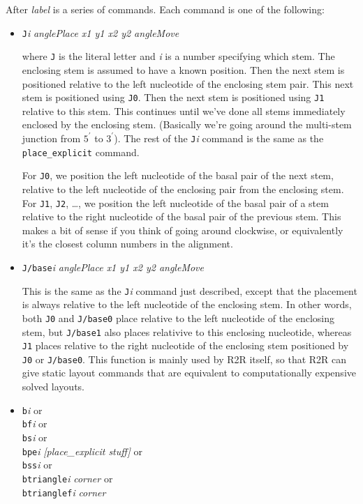 \documentclass[letterpaper,12pt]{report}
\begin{document}
After {\it label} is a series of commands.  Each command is one of the following:
\begin{itemize}
\item
{\tt J}\textit{i} \textit{anglePlace x1 y1 x2 y2 angleMove}

where {\tt J} is the literal letter and \textit{i }is a number specifying
which stem.  The enclosing stem is assumed to have a known position. 
Then the next stem is positioned relative to the left nucleotide of the
enclosing stem pair.  This next stem is positioned using {\tt J0}. Then the
next stem is positioned using {\tt J1} relative to this stem.  This continues
until we{\textquoteright}ve done all stems immediately enclosed by the
enclosing stem.  (Basically we{\textquoteright}re going around the
multi-stem junction from $5^\prime$ to $3^\prime$).  
The rest of the {\tt J}\textit{i} command is
the same as the {\tt place\_explicit} command.

For {\tt J0}, we position the left nucleotide of the basal pair of the next
stem, relative to the left nucleotide of the enclosing pair from the
enclosing stem.  For {\tt J1}, {\tt J2}, {\dots}, we position the left nucleotide
of the basal pair of a stem relative to the right nucleotide of the
basal pair of the previous stem.  This makes a bit of sense if you
think of going around clockwise, or equivalently it{\textquoteright}s
the closest column numbers in the alignment.
\item
{\tt J/base}{\it i} \textit{anglePlace x1 y1 x2 y2 angleMove}

This is the same as the {\tt J}{\it i} command just described, except that
the placement is always relative to the left nucleotide of the enclosing stem.
In other words, both {\tt J0} and {\tt J/base0} place relative to the left nucleotide of the enclosing stem,
but {\tt J/base1} also places relativive to this enclosing nucleotide, whereas
{\tt J1} places relative to the right nucleotide of the enclosing stem positioned by {\tt J0} or {\tt J/base0}.
This function is mainly used by R2R itself, so that R2R can give static layout commands that are equivalent
to computationally expensive solved layouts.
\item
{\tt b}\textit{i}
or\\
{\tt bf}\textit{i}
or\\
{\tt bs}\textit{i}
or\\
{\tt bpe}\textit{i } \textit{[place\_explicit stuff]}
or\\
{\tt bss}\textit{i}
or\\
{\tt btriangle}\textit{i}  \textit{corner}
or\\
{\tt btrianglef}\textit{i}  \textit{corner}


\end{itemize}
\end{document}
